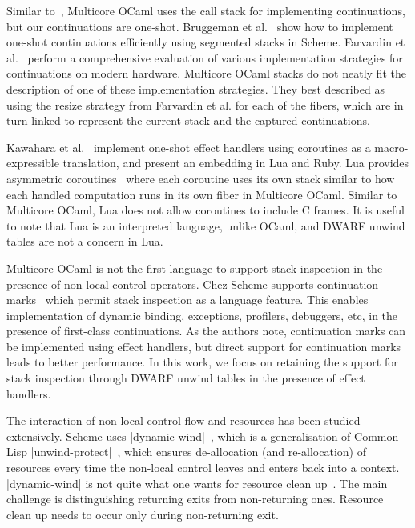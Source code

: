\documentclass[sigplan,10pt,review,anonymous]{acmart}\settopmatter{printfolios=true,printccs=false,printacmref=false}
\begin{document}
Similar to~\cite{Leijen14, Kiselyov12}, Multicore OCaml uses the call stack for
implementing continuations, but our continuations are one-shot. Bruggeman et
al.~\cite{Bruggeman96} show how to implement one-shot continuations efficiently
using segmented stacks in Scheme. Farvardin et al.~\cite{Farvardin20} perform a
comprehensive evaluation of various implementation strategies for continuations
on modern hardware. Multicore OCaml stacks do not neatly fit the description of
one of these implementation strategies. They best described as using the resize
strategy from Farvardin et al. for each of the fibers, which are in turn linked
to represent the current stack and the captured continuations.

Kawahara et al.~\cite{Kawahara20} implement one-shot effect handlers using
coroutines as a macro-expressible translation, and present an embedding in Lua
and Ruby. Lua provides asymmetric coroutines~\cite{Lua} where each coroutine
uses its own stack similar to how each handled computation runs in its own
fiber in Multicore OCaml. Similar to Multicore OCaml, Lua does not allow
coroutines to include C frames. It is useful to note that Lua is an interpreted
language, unlike OCaml, and DWARF unwind tables are not a concern in Lua.

Multicore OCaml is not the first language to support stack inspection in the
presence of non-local control operators. Chez Scheme supports continuation
marks~\cite{Flatt20} which permit stack inspection as a language feature. This
enables implementation of dynamic binding, exceptions, profilers, debuggers,
etc, in the presence of first-class continuations. As the authors note,
continuation marks can be implemented using effect handlers, but direct support
for continuation marks leads to better performance. In this work, we focus on
retaining the support for stack inspection through DWARF unwind tables in the
presence of effect handlers.

The interaction of non-local control flow and resources has been studied
extensively. Scheme uses |dynamic-wind|~\cite{R5RS}, which is a generalisation of
Common Lisp |unwind-protect|~\cite{Steele90}, which ensures de-allocation (and
re-allocation) of resources every time the non-local control leaves and enters
back into a context. |dynamic-wind| is not quite what one wants for resource
clean up~\cite{Kiselyov,Sitaram03}. The main challenge is distinguishing
returning exits from non-returning ones. Resource clean up needs to occur only
during non-returning exit.
\end{document}
